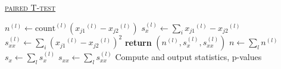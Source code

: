 \documentclass[10pt]{article}
\begin{document}
\begin{algorithm}
        \caption{\underline{\textsc{paired T-test}}}
        \label{naivebayes_train}
        \begin{algorithmic}[1] %
                 
					\State $n^{(l)} \gets \text{count}^{(l)}({x_{j1}}^{(l)} - {x_{j2}}^{(l)})$
                    \State $s_x^{(l)} \gets \sum_i {x_{j1}}^{(l)} - {x_{j2}}^{(l)}$
                    \State $s_{xx}^{(l)} \gets \sum_i {({x_{j1}}^{(l)} - {x_{j2}}^{(l)})}^2$
                    \State \textbf{return} $(n^{(l)}, s_x^{(l)}, s_{xx}^{(l)})$
                \EndProcedure
                     \State $n \gets \sum_l n^{(l)}$
                     \State $s_x \gets \sum_l s_x^{(l)}$
                     \State $s_{xx} \gets \sum_l s_{xx}^{(l)}$
                     \State Compute and output statistics, p-values
                \EndProcedure
        \end{algorithmic}
\end{algorithm}
\end{document}
